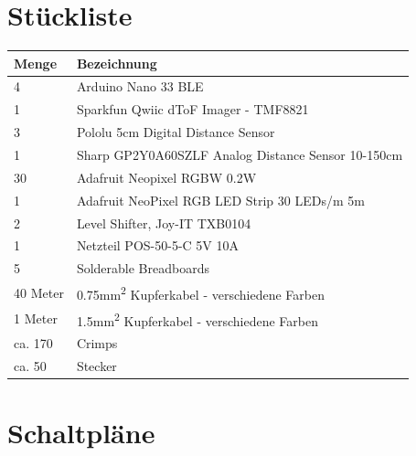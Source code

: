 \section{Stückliste}
    \begin{table}[H]
        \centering
        \begin{tabularx}{\textwidth}{ | l | X | }\hline
            \textbf{Menge} & \textbf{Bezeichnung} \\\hline
            4              & Arduino Nano 33 BLE \\\hline
            1              & Sparkfun Qwiic dToF Imager - TMF8821 \\\hline
            3              & Pololu 5cm Digital Distance Sensor \\\hline
            1              & Sharp GP2Y0A60SZLF Analog Distance Sensor 10-150cm \\\hline
            30             & Adafruit Neopixel RGBW 0.2W \\\hline            1              & Adafruit NeoPixel RGB LED Strip 30 LEDs/m 5m \\\hline
            2              & Level Shifter, Joy-IT TXB0104 \\\hline
            1              & Netzteil POS-50-5-C 5V 10A \\\hline
            5              & Solderable Breadboards \\\hline
            40 Meter       & 0.75mm\textsuperscript{2} Kupferkabel - verschiedene Farben \\\hline
            1 Meter        & 1.5mm\textsuperscript{2} Kupferkabel - verschiedene Farben \\\hline
            ca. 170        & Crimps \\\hline
            ca. 50         & Stecker \\\hline
        \end{tabularx}
    \end{table}

\section{Schaltpläne}

